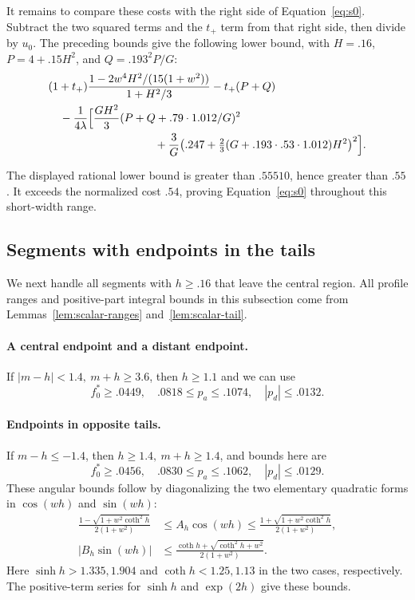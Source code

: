 It remains to compare these costs with the right side of
Equation~\eqref{eq:s0}. Subtract the two squared terms and the
$t_+$ term from that right side, then divide by $u_0$.
The preceding bounds give the following lower bound, with
$H=.16$, $P=4+.15H^2$, and $Q=.193^2P/G$:
\[
\begin{aligned}
 &(1+t_+)\frac{1-2w^4H^2/(15(1+w^2))}{1+H^2/3}-t_+(P+Q)\\
 &\quad-\frac1{4\lambda}\Bigl[\frac{GH^2}{3}(P+Q+.79\cdot1.012/G)^2\\
 &\hspace{95pt}+\frac3G\bigl(.247+\tfrac23(G+.193\cdot.53\cdot1.012)H^2\bigr)^2\Bigr].
\end{aligned}
\]

The displayed rational lower bound is greater than $.55510$, hence greater
than $.55$. It exceeds the normalized cost $.54$, proving
Equation~\eqref{eq:s0} throughout this short-width range.

\subsection{Segments with endpoints in the tails}\label{subsec:segments-tails}

We next handle all segments with $h\ge.16$ that leave the central region.
All profile ranges and positive-part integral bounds in this subsection
come from Lemmas~\ref{lem:scalar-ranges} and~\ref{lem:scalar-tail}.

\paragraph{A central endpoint and a distant endpoint.}
If \(|m-h|<1.4,\ m+h\ge3.6\), then \(h\ge1.1\) and we can use
\[
 f_0^*\ge.0449,\quad .0818\le p_a\le.1074,\quad |p_d|\le.0132 .
\]
\paragraph{Endpoints in opposite tails.}
If $m-h\le-1.4$, then \(h\ge1.4,\ m+h\ge1.4\), and bounds here are
\[
 f_0^*\ge.0456,\quad .0830\le p_a\le.1062,\quad |p_d|\le.0129.
\]
These angular bounds follow by diagonalizing the two elementary
quadratic forms in $\cos(wh)$ and $\sin(wh)$:
\[
\begin{aligned}
 \frac{1-\sqrt{1+w^2\coth^2h}}{2(1+w^2)}
 &\le A_h\cos(wh)\le
 \frac{1+\sqrt{1+w^2\coth^2h}}{2(1+w^2)},\\
 |B_h\sin(wh)|&\le
 \frac{\coth h+\sqrt{\coth^2h+w^2}}{2(1+w^2)}.
\end{aligned}
\]
Here $\sinh h>1.335,1.904$ and $\coth h<1.25,1.13$ in the two
cases, respectively. The positive-term series for $\sinh h$ and
$\exp(2h)$ give these bounds.


